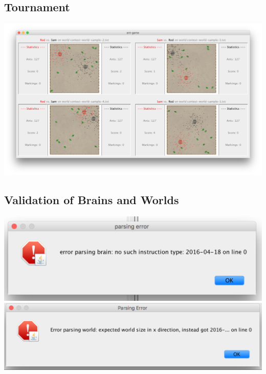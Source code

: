 \documentclass[11pt]{article}
\begin{document}
\subsection{Tournament}

\begin{center}
\includegraphics[width=\textwidth]{tournament}
\end{center}

\newpage
\subsection{Validation of Brains and Worlds}

\begin{center}
\includegraphics[width=\textwidth]{error-brain}
\includegraphics[width=\textwidth]{error-world}
\end{center}
\end{document}
